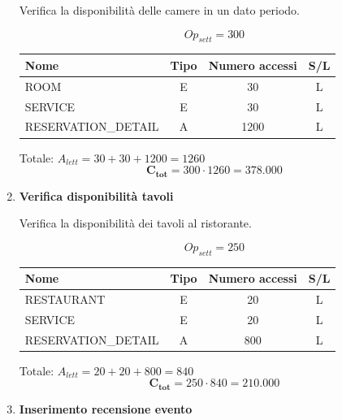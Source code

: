 \documentclass[a4paper,12pt]{report}
\begin{document}
\begin{enumerate}
    Verifica la disponibilità delle camere in un dato periodo.
    
    $$Op_{sett} = 300$$
    
    \begin{table}[H]
        \centering
        \small
        \renewcommand{\arraystretch}{1.15}
        \begin{tabularx}{0.8\textwidth}{|X|c|c|c|}
            \hline
            \rowcolor{gray!20}
            \textbf{Nome} & \textbf{Tipo} & \textbf{Numero accessi} & \textbf{S/L} \\
            \hline
            ROOM & E & 30 & L \\
            SERVICE & E & 30 & L \\
            RESERVATION\_DETAIL & A & 1200 & L \\
            \hline
        \end{tabularx}
    \end{table}
    
    Totale: $A_{lett} = 30 + 30 + 1200 = 1260$
    $$\mathbf{C_{tot}} = 300 \cdot 1260 = \mathbf{378.000}$$

    \item {\large \textbf{Verifica disponibilità tavoli}} \label{op8}
    
    Verifica la disponibilità dei tavoli al ristorante.
    
    $$Op_{sett} = 250$$
    
    \begin{table}[H]
        \centering
        \small
        \renewcommand{\arraystretch}{1.15}
        \begin{tabularx}{0.8\textwidth}{|X|c|c|c|}
            \hline
            \rowcolor{gray!20}
            \textbf{Nome} & \textbf{Tipo} & \textbf{Numero accessi} & \textbf{S/L} \\
            \hline
            RESTAURANT & E & 20 & L \\
            SERVICE & E & 20 & L \\
            RESERVATION\_DETAIL & A & 800 & L \\
            \hline
        \end{tabularx}
    \end{table}
    
    Totale: $A_{lett} = 20 + 20 + 800 = 840$
    $$\mathbf{C_{tot}} = 250 \cdot 840 = \mathbf{210.000}$$

    \item {\large \textbf{Inserimento recensione evento}} \label{op9}
    

\end{enumerate}
\end{document}

